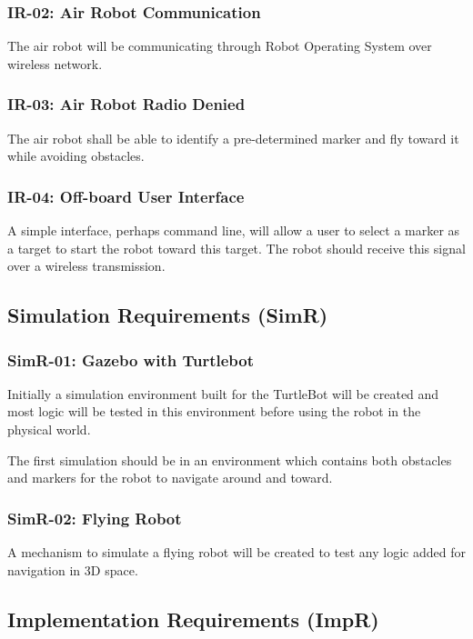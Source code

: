 \documentclass{article}
\begin{document}
		\subsubsection{IR-02: Air Robot Communication}
		
		The air robot will be communicating through Robot Operating System over wireless network.
		
		\subsubsection{IR-03: Air Robot Radio Denied}
		
		The air robot shall be able to identify a pre-determined marker and fly toward it while avoiding obstacles. 
		
		\subsubsection{IR-04: Off-board User Interface}
		
		A simple interface, perhaps command line, will allow a user to select a marker as a target to start the robot toward this target. The robot should receive this signal over a wireless transmission.
		
	\subsection{Simulation Requirements (SimR)}
	
		\subsubsection{SimR-01: Gazebo with Turtlebot}
		
		Initially a simulation environment built for the TurtleBot will be created and most logic will be tested in this environment before using the robot in the physical world.
		
		The first simulation should be in an environment which contains both obstacles and markers for the robot to navigate around and toward.
		
		\subsubsection{SimR-02: Flying Robot}
		
		A mechanism to simulate a flying robot will be created to test any logic added for navigation in 3D space.
		
	
	\subsection{Implementation Requirements (ImpR)}
	
\end{document}
